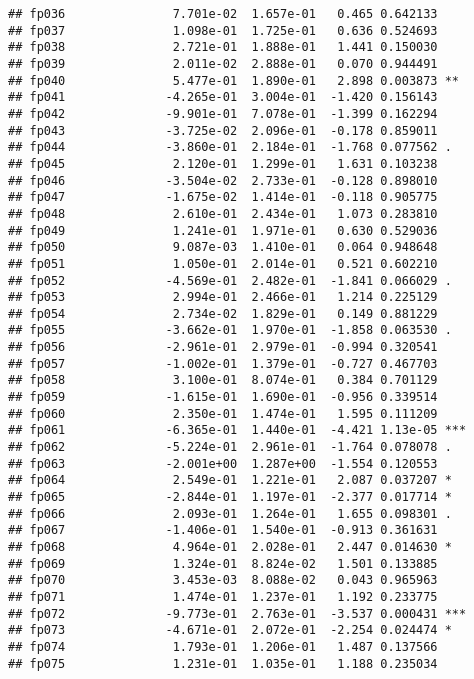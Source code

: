 \documentclass[]{article}
\begin{document}
\begin{verbatim}
## fp036               7.701e-02  1.657e-01   0.465 0.642133    
## fp037               1.098e-01  1.725e-01   0.636 0.524693    
## fp038               2.721e-01  1.888e-01   1.441 0.150030    
## fp039               2.011e-02  2.888e-01   0.070 0.944491    
## fp040               5.477e-01  1.890e-01   2.898 0.003873 ** 
## fp041              -4.265e-01  3.004e-01  -1.420 0.156143    
## fp042              -9.901e-01  7.078e-01  -1.399 0.162294    
## fp043              -3.725e-02  2.096e-01  -0.178 0.859011    
## fp044              -3.860e-01  2.184e-01  -1.768 0.077562 .  
## fp045               2.120e-01  1.299e-01   1.631 0.103238    
## fp046              -3.504e-02  2.733e-01  -0.128 0.898010    
## fp047              -1.675e-02  1.414e-01  -0.118 0.905775    
## fp048               2.610e-01  2.434e-01   1.073 0.283810    
## fp049               1.241e-01  1.971e-01   0.630 0.529036    
## fp050               9.087e-03  1.410e-01   0.064 0.948648    
## fp051               1.050e-01  2.014e-01   0.521 0.602210    
## fp052              -4.569e-01  2.482e-01  -1.841 0.066029 .  
## fp053               2.994e-01  2.466e-01   1.214 0.225129    
## fp054               2.734e-02  1.829e-01   0.149 0.881229    
## fp055              -3.662e-01  1.970e-01  -1.858 0.063530 .  
## fp056              -2.961e-01  2.979e-01  -0.994 0.320541    
## fp057              -1.002e-01  1.379e-01  -0.727 0.467703    
## fp058               3.100e-01  8.074e-01   0.384 0.701129    
## fp059              -1.615e-01  1.690e-01  -0.956 0.339514    
## fp060               2.350e-01  1.474e-01   1.595 0.111209    
## fp061              -6.365e-01  1.440e-01  -4.421 1.13e-05 ***
## fp062              -5.224e-01  2.961e-01  -1.764 0.078078 .  
## fp063              -2.001e+00  1.287e+00  -1.554 0.120553    
## fp064               2.549e-01  1.221e-01   2.087 0.037207 *  
## fp065              -2.844e-01  1.197e-01  -2.377 0.017714 *  
## fp066               2.093e-01  1.264e-01   1.655 0.098301 .  
## fp067              -1.406e-01  1.540e-01  -0.913 0.361631    
## fp068               4.964e-01  2.028e-01   2.447 0.014630 *  
## fp069               1.324e-01  8.824e-02   1.501 0.133885    
## fp070               3.453e-03  8.088e-02   0.043 0.965963    
## fp071               1.474e-01  1.237e-01   1.192 0.233775    
## fp072              -9.773e-01  2.763e-01  -3.537 0.000431 ***
## fp073              -4.671e-01  2.072e-01  -2.254 0.024474 *  
## fp074               1.793e-01  1.206e-01   1.487 0.137566    
## fp075               1.231e-01  1.035e-01   1.188 0.235034    

\end{verbatim}
\end{document}
